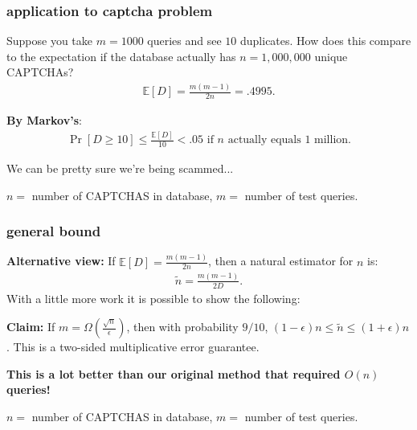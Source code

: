 \documentclass[]{beamer}
\newcommand{\E}{\mathbb{E}}
\begin{document}
	\begin{frame}
		\frametitle{application to captcha problem}
		Suppose you take $m = 1000$ queries and see $10$ duplicates. How does this compare to the expectation if the database actually has $n = 1,000,000$ unique CAPTCHAs?
		\begin{align*}
			\E[D] = \frac{m(m-1)}{2n} = .4995.
		\end{align*}
		
		\textbf{By Markov's}:
		\begin{align*}
			\Pr[D \geq 10] \leq \frac{\E[D]}{10} < .05 \text{ if $n$ actually equals $1$ million}. 
		\end{align*}
		
		We can be pretty sure we're being scammed...
		
		\vspace{1em}
		\begin{block}{\vspace*{-3ex}}
			\small $n = $ number of CAPTCHAS in database, $m=$ number of test queries.
		\end{block}
	\end{frame}
	
	\begin{frame}
		\frametitle{general bound}
		\textbf{Alternative view:} If $\E[D] = \frac{m(m-1)}{2n}$, then a natural estimator for $n$ is:
		\begin{align*}
			\tilde{n} = \frac{m(m-1)}{2D}.
		\end{align*}
		With a little more work it is possible to show the following: 
		
		\textbf{Claim:} If $m = \Omega\left(\frac{\sqrt{n}}{\epsilon}\right)$, then with probability $9/10$, $(1-\epsilon)n \leq \tilde n \leq (1+\epsilon) n$. This is a two-sided \alert{multiplicative} error guarantee.
		
		\begin{center}
			\textbf{\alert{This is a lot better than our original method that required $O(n)$ queries!}}
		\end{center}
		
		\vspace{6em}
		\begin{block}{\vspace*{-3ex}}
			\small $n = $ number of CAPTCHAS in database, $m=$ number of test queries.
		\end{block}
	\end{frame}
	
\end{document}
